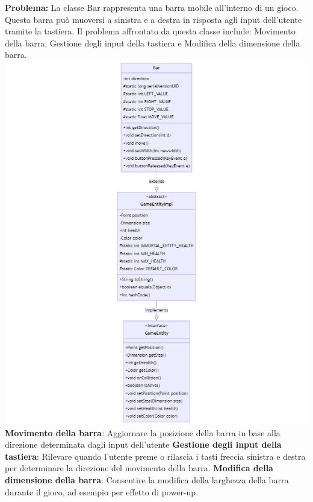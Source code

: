 \documentclass[a4paper,12pt]{report}
\begin{document}
{\textbf{Problema:}} La classe Bar rappresenta una barra mobile all'interno di un gioco. Questa barra può muoversi a sinistra e a destra in risposta agli input dell'utente tramite la tastiera. Il problema affrontato da questa classe include: Movimento della barra, Gestione degli input della tastiera e Modifica della dimensione della barra.
\newline
\includegraphics[width=\textwidth]{Bar.png}
\newline \textbf{Movimento della barra}: Aggiornare la posizione della barra in base alla direzione determinata dagli input dell'utente
\newline \textbf{Gestione degli input della tastiera}: Rilevare quando l'utente preme o rilascia i tasti freccia sinistra e destra per determinare la direzione del movimento della barra.
\newline \textbf{Modifica della dimensione della barra}: Consentire la modifica della larghezza della barra durante il gioco, ad esempio per effetto di power-up. 
\end{document}
